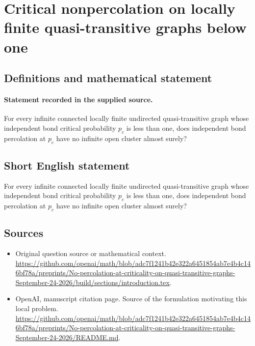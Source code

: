 \documentclass[11pt]{article}
\begin{document}
\section*{Critical nonpercolation on locally finite quasi-transitive graphs below one}\label{statement}
\subsection{Definitions and mathematical statement}
\paragraph{Statement recorded in the supplied source.}
For every infinite connected locally finite undirected quasi-transitive graph whose independent bond critical probability $p_c$ is less than one, does independent bond percolation at $p_c$ have no infinite open cluster almost surely?
\subsection{Short English statement}
For every infinite connected locally finite undirected quasi-transitive graph whose independent bond critical probability $p_c$ is less than one, does independent bond percolation at $p_c$ have no infinite open cluster almost surely?
\subsection{Sources}
\begin{itemize}
\item[S1] Original question source or mathematical context.
\url{https://github.com/openai/math/blob/adc7f1241b42e322a6451854ab7e4b4c146bf78a/preprints/No-percolation-at-criticality-on-quasi-transitive-graphs-September-24-2026/build/sections/introduction.tex}.
\item[S2] OpenAI, manuscript citation page. Source of the formulation motivating this local problem.
\url{https://github.com/openai/math/blob/adc7f1241b42e322a6451854ab7e4b4c146bf78a/preprints/No-percolation-at-criticality-on-quasi-transitive-graphs-September-24-2026/README.md}.
\end{itemize}
\end{document}
